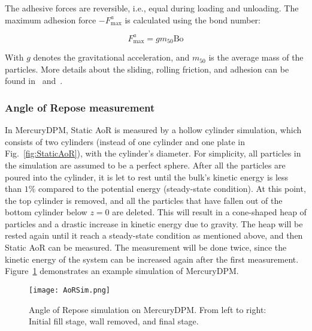 The adhesive forces are reversible, i.e., equal during loading and unloading. The maximum adhesion force $-F^a_{\text{max}}$ is calculated using the bond number:

\begin{equation}\label{eq:bond}
    F^a_{\text{max}} = gm_{\text{50}}\text{Bo} 
\end{equation}

With $g$ denotes the gravitational acceleration, and $m_{50}$ is the average mass of the particles. More details about the sliding, rolling friction, and adhesion can be found in~\cite{MercuryDPM} and~\cite{LSD-info}. 
\subsubsection{Angle of Repose measurement}

In MercuryDPM, Static AoR is measured by a hollow cylinder simulation, which consists of two cylinders (instead of one cylinder and one plate in Fig.~\ref{fig:StaticAoR}), with the cylinder's diameter. For simplicity, all particles in the simulation are assumed to be a perfect sphere. After all the particles are poured into the cylinder, it is let to rest until the bulk's kinetic energy is less than $1\%$ compared to the potential energy (steady-state condition). At this point, the top cylinder is removed, and all the particles that have fallen out of the bottom cylinder below $z = 0$ are deleted. This will result in a cone-shaped heap of particles and a drastic increase in kinetic energy due to gravity. The heap will be rested again until it reach a steady-state condition as mentioned above, and then Static AoR can be measured. The measurement will be done twice, since the kinetic energy of the system can be increased again after the first measurement. Figure~\ref{fig:MercuryAoR} demonstrates an example simulation of MercuryDPM.    


\begin{figure}[H]
    \centering
    \texttt{[image: AoRSim.png]}
    \caption{Angle of Repose simulation on MercuryDPM. From left to right: Initial fill stage, wall removed, and final stage.}\label{fig:MercuryAoR}
\end{figure}
